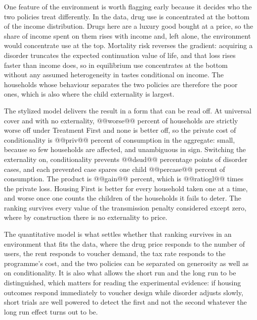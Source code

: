 \documentclass[10pt]{article}
\begin{document}
One feature of the environment is worth flagging early because it decides who the
two policies treat differently. In the data, drug use is concentrated at the bottom
of the income distribution. Drugs here are a luxury good bought at a price, so the
share of income spent on them rises with income and, left alone, the environment
would concentrate use at the top. Mortality risk reverses the gradient: acquiring a
disorder truncates the expected continuation value of life, and that loss rises
faster than income does, so in equilibrium use concentrates at the bottom without
any assumed heterogeneity in tastes conditional on income. The households whose
behaviour separates the two policies are therefore the poor ones, which is also
where the child externality is largest.



The stylized model delivers the result in a form that can be read off. At universal
cover and with no externality, @@worse@@ percent of households are strictly worse
off under Treatment First and none is better off, so the private cost of
conditionality is @@priv@@ percent of consumption in the aggregate: small, because
so few households are affected, and unambiguous in sign. Switching the externality
on, conditionality prevents @@dsud@@ percentage points of disorder cases, and each
prevented case spares one child @@percase@@ percent of consumption. The product is
@@gain@@ percent, which is @@ratiogl@@ times the private loss. Housing First is
better for every household taken one at a time, and worse once one counts the
children of the households it fails to deter. The ranking survives every value of
the transmission penalty considered except zero, where by construction there is no
externality to price.



The quantitative model is what settles whether that ranking survives in an
environment that fits the data, where the drug price responds to the number of
users, the rent responds to voucher demand, the tax rate responds to the programme's
cost, and the two policies can be separated on generosity as well as on
conditionality. It is also what allows the short run and the long run to be
distinguished, which matters for reading the experimental evidence: if housing
outcomes respond immediately to voucher design while disorder adjusts slowly,
short trials are well powered to detect the first and not the second whatever the
long run effect turns out to be.
\end{document}
